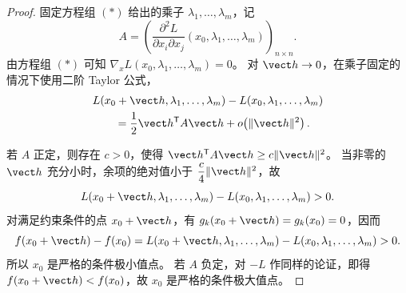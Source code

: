 \begin{proof}
固定方程组 $(*)$ 给出的乘子
$\lambda_1,\ldots,\lambda_m$，记
\[
A=\left(
\frac{\partial^2L}{\partial x_i\partial x_j}
(x_0,\lambda_1,\ldots,\lambda_m)
\right)_{n\times n}.
\]
由方程组 $(*)$ 可知
$\nabla_xL(x_0,\lambda_1,\ldots,\lambda_m)=0$。
对 $\vect h\to0$，在乘子固定的情况下使用二阶 Taylor 公式，
\[
\begin{aligned}
&L(x_0+\vect h,\lambda_1,\ldots,\lambda_m)
 -L(x_0,\lambda_1,\ldots,\lambda_m)\\
&\qquad=
\frac12\vect h^{\mathsf T}A\vect h
+o\!\left(\lVert\vect h\rVert^2\right).
\end{aligned}
\]

若 $A$ 正定，则存在 $c>0$，使得
$\vect h^{\mathsf T}A\vect h\ge c\lVert\vect h\rVert^2$。
当非零的 $\vect h$ 充分小时，余项的绝对值小于
$\dfrac c4\lVert\vect h\rVert^2$，故
\[
L(x_0+\vect h,\lambda_1,\ldots,\lambda_m)
 -L(x_0,\lambda_1,\ldots,\lambda_m)>0.
\]
对满足约束条件的点 $x_0+\vect h$，有
$g_k(x_0+\vect h)=g_k(x_0)=0$，因而
\[
f(x_0+\vect h)-f(x_0)
=L(x_0+\vect h,\lambda_1,\ldots,\lambda_m)
 -L(x_0,\lambda_1,\ldots,\lambda_m)>0.
\]
所以 $x_0$ 是严格的条件极小值点。
若 $A$ 负定，对 $-L$ 作同样的论证，即得
$f(x_0+\vect h)<f(x_0)$，故 $x_0$ 是严格的条件极大值点。
\end{proof}
